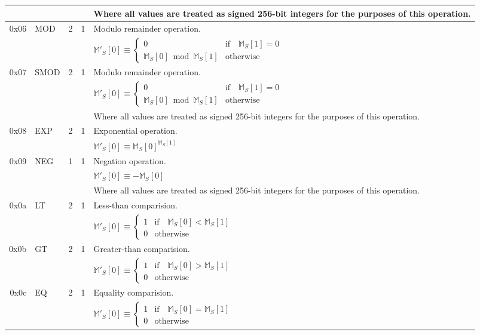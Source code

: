 \documentclass[9pt,oneside]{amsart}
\begin{document}
\begin{tabular*}{\columnwidth}[h]{rlrrl}
&&&& Where all values are treated as signed 256-bit integers for the purposes of this operation. \\
\midrule
0x06 & {\small MOD} & 2 & 1 & Modulo remainder operation. \\
&&&& $\mathbb{M}'_S[0] \equiv \begin{cases}0 & \text{if} \quad \mathbb{M}_S[1] = 0\\ \mathbb{M}_S[0] \bmod \mathbb{M}_S[1] & \text{otherwise}\end{cases}$  \\
\midrule
0x07 & {\small SMOD} & 2 & 1 & Modulo remainder operation. \\
&&&& $\mathbb{M}'_S[0] \equiv \begin{cases}0 & \text{if} \quad \mathbb{M}_S[1] = 0\\ \mathbb{M}_S[0] \bmod \mathbb{M}_S[1] & \text{otherwise}\end{cases}$  \\
&&&& Where all values are treated as signed 256-bit integers for the purposes of this operation. \\
\midrule
0x08 & {\small EXP} & 2 & 1 & Exponential operation. \\
&&&& $\mathbb{M}'_S[0] \equiv \mathbb{M}_S[0] ^ {\mathbb{M}_S[1] }$ \\
\midrule
0x09 & {\small NEG} & 1 & 1 & Negation operation. \\
&&&& $\mathbb{M}'_S[0] \equiv -\mathbb{M}_S[0]$ \\
&&&& Where all values are treated as signed 256-bit integers for the purposes of this operation. \\
\midrule
0x0a & {\small LT} & 2 & 1 & Less-than comparision. \\
&&&& $\mathbb{M}'_S[0] \equiv \begin{cases} 1 & \text{if} \quad \mathbb{M}_S[0] < \mathbb{M}_S[1] \\ 0 & \text{otherwise} \end{cases}$ \\
\midrule
0x0b & {\small GT} & 2 & 1 & Greater-than comparision. \\
&&&& $\mathbb{M}'_S[0] \equiv \begin{cases} 1 & \text{if} \quad \mathbb{M}_S[0] > \mathbb{M}_S[1] \\ 0 & \text{otherwise} \end{cases}$ \\
\midrule
0x0c & {\small EQ} & 2 & 1 & Equality comparision. \\
&&&& $\mathbb{M}'_S[0] \equiv \begin{cases} 1 & \text{if} \quad \mathbb{M}_S[0] = \mathbb{M}_S[1] \\ 0 & \text{otherwise} \end{cases}$ \\

\end{tabular*}
\end{document}
